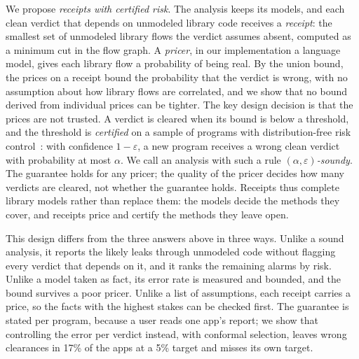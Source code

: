 We propose \emph{receipts with certified risk}.
The analysis keeps its models, and each clean verdict that depends on unmodeled library code receives a \emph{receipt}: the smallest set of unmodeled library flows the verdict assumes absent, computed as a minimum cut in the flow graph.
A \emph{pricer}, in our implementation a language model, gives each library flow a probability of being real.
By the union bound, the prices on a receipt bound the probability that the verdict is wrong, with no assumption about how library flows are correlated, and we show that no bound derived from individual prices can be tighter.
The key design decision is that the prices are not trusted.
A verdict is cleared when its bound is below a threshold, and the threshold is \emph{certified} on a sample of programs with distribution-free risk control~\cite{lt}: with confidence $1-\varepsilon$, a new program receives a wrong clean verdict with probability at most $\alpha$.
We call an analysis with such a rule \emph{$(\alpha,\varepsilon)$-soundy}.
The guarantee holds for any pricer; the quality of the pricer decides how many verdicts are cleared, not whether the guarantee holds.
Receipts thus complete library models rather than replace them: the models decide the methods they cover, and receipts price and certify the methods they leave open.

This design differs from the three answers above in three ways.
Unlike a sound analysis, it reports the likely leaks through unmodeled code without flagging every verdict that depends on it, and it ranks the remaining alarms by risk.
Unlike a model taken as fact, its error rate is measured and bounded, and the bound survives a poor pricer.
Unlike a list of assumptions, each receipt carries a price, so the facts with the highest stakes can be checked first.
The guarantee is stated per program, because a user reads one app's report; we show that controlling the error per verdict instead, with conformal selection, leaves wrong clearances in 17\% of the apps at a 5\% target and misses its own target.

